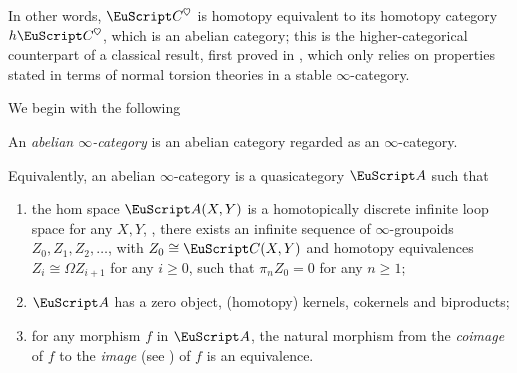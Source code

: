 In other words, $\C^\heart$ is homotopy equivalent to its homotopy category $h\C^\heart$, which is an abelian category; this is the higher-categorical counterpart of a classical result, first proved in \cite[\athm\textbf{1.3.6}]{BBDPervers}, 
which 
only relies on properties stated in terms of normal torsion theories in a stable $\infty$-category. 
{\color{green!40!black}
We begin with the following
\begin{definition}\label{df:abelinfty}
An \emph{abelian $\infty$-category}  is an abelian
category regarded as an $\infty$-category.
\end{definition}
\begin{remark}
Equivalently, an abelian $\infty$-category is a quasicategory $\cate{A}$
such that
\begin{enumerate}[label=$\roman*$)]
\item the hom space $\cate{A}(X,Y)$ is a homotopically discrete infinite loop space for any $X, Y$, \ie, there exists an infinite sequence of $\infty$-groupoids $Z_0, Z_1,Z_2,\dots$, with $Z_0\cong \C(X,Y)$ and homotopy equivalences $Z_i\cong \Omega Z_{i+1}$ for any $i\geq 0$, such that $\pi_n Z_0=0$ for any $n\geq 1$;
\item $\cate{A}$ has a zero object, (homotopy) kernels, cokernels and biproducts;
\item for any morphism $f$ in $\cate{A}$, the natural morphism from the \emph{coimage} of $f$ to the \emph{image} (see \adef{}) of $f$ is an equivalence.
\end{enumerate}
\end{remark}
}

